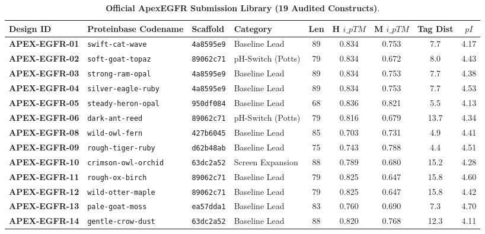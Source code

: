 \documentclass[11pt]{article}
\begin{document}
\begin{table}[htbp]
\centering
\footnotesize
\caption{\textbf{Official ApexEGFR Submission Library (19 Audited Constructs)}.}
\label{tab:master_manifest}
\begin{tabularx}{\textwidth}{llp{1.3cm}Xccccc}
\toprule
\textbf{Design ID} & \textbf{Proteinbase Codename} & \textbf{Scaffold} & \textbf{Category} & \textbf{Len} & \textbf{H $i\_pTM$} & \textbf{M $i\_pTM$} & \textbf{Tag Dist} & \textbf{$pI$} \\
\midrule
\textbf{APEX-EGFR-01} & \texttt{swift-cat-wave} & \texttt{4a8595e9} & Baseline Lead & 89 & 0.834 & 0.753 & 7.7 & 4.17 \\
\textbf{APEX-EGFR-02} & \texttt{soft-goat-topaz} & \texttt{89062c71} & pH-Switch (Potts) & 79 & 0.834 & 0.672 & 8.0 & 4.43 \\
\textbf{APEX-EGFR-03} & \texttt{strong-ram-opal} & \texttt{4a8595e9} & Baseline Lead & 89 & 0.834 & 0.753 & 7.7 & 4.38 \\
\textbf{APEX-EGFR-04} & \texttt{silver-eagle-ruby} & \texttt{4a8595e9} & Baseline Lead & 89 & 0.834 & 0.753 & 7.7 & 4.53 \\
\textbf{APEX-EGFR-05} & \texttt{steady-heron-opal} & \texttt{950df084} & Baseline Lead & 68 & 0.836 & 0.821 & 5.5 & 4.13 \\
\textbf{APEX-EGFR-06} & \texttt{dark-ant-reed} & \texttt{89062c71} & pH-Switch (Potts) & 79 & 0.816 & 0.679 & 13.7 & 4.34 \\
\textbf{APEX-EGFR-08} & \texttt{wild-owl-fern} & \texttt{427b6045} & Baseline Lead & 85 & 0.703 & 0.731 & 4.9 & 4.41 \\
\textbf{APEX-EGFR-09} & \texttt{rough-tiger-ruby} & \texttt{d62b48ab} & Baseline Lead & 75 & 0.743 & 0.788 & 4.4 & 4.51 \\
\textbf{APEX-EGFR-10} & \texttt{crimson-owl-orchid} & \texttt{63dc2a52} & Screen Expansion & 88 & 0.789 & 0.680 & 15.2 & 4.28 \\
\textbf{APEX-EGFR-11} & \texttt{rough-ox-birch} & \texttt{89062c71} & Baseline Lead & 79 & 0.825 & 0.647 & 15.8 & 4.60 \\
\textbf{APEX-EGFR-12} & \texttt{wild-otter-maple} & \texttt{89062c71} & Baseline Lead & 79 & 0.825 & 0.647 & 15.8 & 4.42 \\
\textbf{APEX-EGFR-13} & \texttt{pale-goat-moss} & \texttt{ea57dda1} & Baseline Lead & 83 & 0.760 & 0.690 & 7.3 & 4.70 \\
\textbf{APEX-EGFR-14} & \texttt{gentle-crow-dust} & \texttt{63dc2a52} & Baseline Lead & 88 & 0.820 & 0.768 & 12.3 & 4.11 \\

\end{tabularx}
\end{table}
\end{document}
